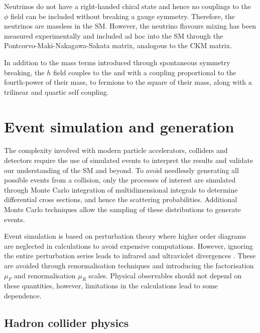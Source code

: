 Neutrinos do not have a right-handed chiral state and hence no couplings to the $\phi$ field can be included without breaking a gauge symmetry. Therefore, the neutrinos are massless in the SM. However, the neutrino flavours mixing has been measured experimentally and included ad hoc into the SM through the Pontcorvo-Maki-Nakagawa-Sakata matrix\cite{Pontecorvo:1957qd,Maki:1962mu}, analogous to the CKM matrix.

In addition to the mass terms introduced through spontaneous symmetry breaking, the $h$ field couples to the \PW and \PZ with a coupling proportional to the fourth-power of their mass, to fermions to the square of their mass, along with a trilinear and quartic self coupling.


\section{Event simulation and generation}

The complexity involved with modern particle accelerators, colliders and detectors require the use of simulated events to interpret the results and validate our understanding of the SM and beyond. To avoid needlessly generating all possible events from a collision, only the processes of interest are simulated through Monte Carlo integration of multidimensional integrals to determine differential cross sections, and hence the scattering probabilities. Additional Monte Carlo techniques allow the sampling of these distributions to generate events.

Event simulation is based on perturbation theory where higher order diagrams are neglected in calculations to avoid expensive computations. However, ignoring the entire perturbation series leads to infrared and ultraviolet divergences \cite{Ellis:1991qj}. These are avoided through renormalisation techniques and introducing the factorisation $\mu_F$ and renormalisation $\mu_R$ scales. Physical observables should not depend on these quantities, however, limitations in the calculations lead to some dependence.


\subsection{Hadron collider physics}\label{sec:hadron-collider-physics}

